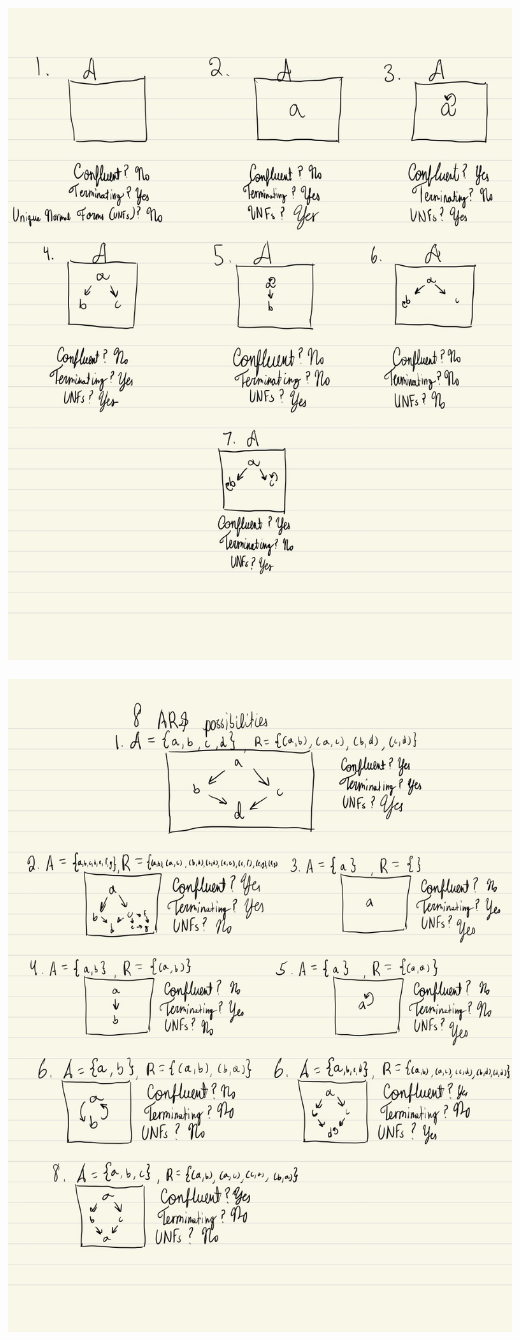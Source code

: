 \documentclass{article}
\theoremstyle{theorem}
\theoremstyle{definition}
\theoremstyle{remark}
\begin{document}
\includegraphics [scale=0.50]{ARS1}

\includegraphics [scale=0.50]{ARS2}	
\end{document}
